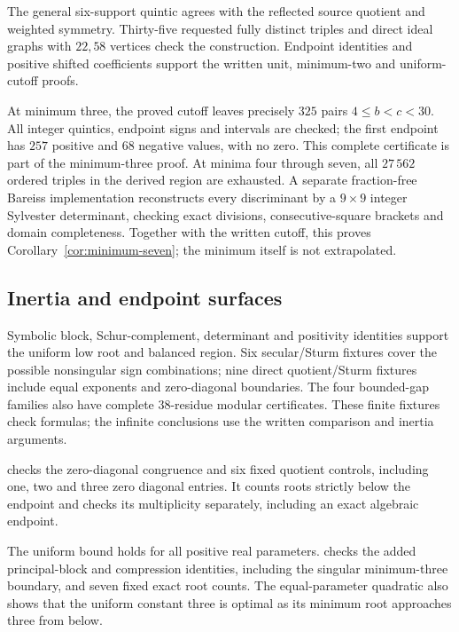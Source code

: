 The general six-support quintic agrees with the reflected source quotient
and weighted symmetry. Thirty-five requested fully distinct triples and
direct ideal graphs with $22,58$ vertices check the construction. Endpoint
identities and positive shifted coefficients support the written unit,
minimum-two and uniform-cutoff proofs.

At minimum three, the proved cutoff leaves precisely $325$ pairs
$4\leq b<c<30$. All integer quintics, endpoint signs and intervals are
checked; the first endpoint has $257$ positive and $68$ negative values,
with no zero. This complete certificate is part of the minimum-three proof.
At minima four through seven, all $27\,562$ ordered triples in the derived
region are exhausted. A separate fraction-free Bareiss implementation
reconstructs every discriminant by a $9\times9$ integer Sylvester
determinant, checking exact divisions, consecutive-square brackets and
domain completeness. Together with the written cutoff, this proves
Corollary~\ref{cor:minimum-seven}; the minimum itself is not extrapolated.

\subsection{Inertia and endpoint surfaces}

Symbolic block, Schur-complement, determinant and positivity identities
support the uniform low root and balanced region. Six secular/Sturm
fixtures cover the possible nonsingular sign combinations; nine direct
quotient/Sturm fixtures include equal exponents and zero-diagonal boundaries.
The four bounded-gap families also have complete $38$-residue modular
certificates. These finite fixtures check formulas; the infinite conclusions
use the written comparison and inertia arguments.

 checks the zero-diagonal
congruence and six fixed quotient controls, including one, two and three
zero diagonal entries. It counts roots strictly below the endpoint and
checks its multiplicity separately, including an exact algebraic endpoint.

The uniform bound holds for all positive real parameters.
 checks the added
principal-block and compression identities, including the singular
minimum-three boundary, and seven fixed exact root counts.
The equal-parameter quadratic also shows that the uniform constant three
is optimal as its minimum root approaches three from below.

